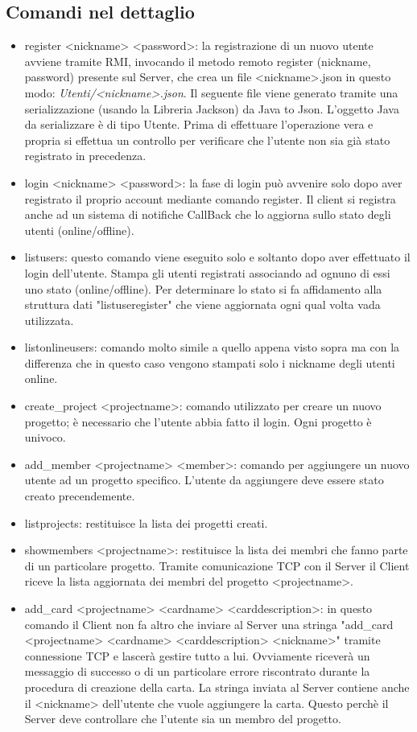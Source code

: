 \documentclass{article} %
\begin{document}
\subsection{Comandi nel dettaglio}
\begin{itemize}
    \item register <nickname> <password>: la registrazione di un nuovo utente avviene tramite RMI, invocando il metodo remoto register (nickname, password) presente sul Server, che crea un file <nickname>.json in questo modo: {\itshape Utenti/<nickname>.json}. Il seguente file viene generato tramite una serializzazione (usando la Libreria Jackson) da Java to Json. L'oggetto Java da serializzare è di tipo Utente. Prima di effettuare l'operazione vera e propria si effettua un controllo per verificare che l'utente non sia già stato registrato in precedenza.
    \item login <nickname> <password>: la fase di login può avvenire solo dopo aver registrato il proprio account mediante comando register. Il client si registra anche ad un sistema di notifiche CallBack che lo aggiorna sullo stato degli utenti (online/offline).
    \item listusers: questo comando viene eseguito solo e soltanto dopo aver effettuato il login dell'utente. Stampa gli utenti registrati associando ad ognuno di essi uno stato (online/offline). Per determinare lo stato si fa affidamento alla struttura dati "listuseregister" che viene aggiornata ogni qual volta vada utilizzata.
    \item listonlineusers: comando molto simile a quello appena visto sopra ma con la differenza che in questo caso vengono stampati solo i nickname degli utenti online.
    \item create\_project <projectname>: comando utilizzato per creare un nuovo progetto; è necessario che l'utente abbia fatto il login. Ogni progetto è univoco.
    \item add\_member <projectname> <member>:  comando per aggiungere un nuovo utente ad un progetto specifico. L'utente da aggiungere deve essere stato creato precendemente. 
    \item listprojects: restituisce la lista dei progetti creati.
    \item showmembers <projectname>: restituisce la lista dei membri che fanno parte di un particolare progetto. Tramite comunicazione TCP con il Server il Client riceve la lista aggiornata dei membri del progetto <projectname>. 
    \item add\_card <projectname> <cardname> <carddescription>:  in questo comando il Client non fa altro che inviare al Server una stringa "add\_card <projectname> <cardname> <carddescription> <nickname>" tramite connessione TCP e lascerà gestire tutto a lui. Ovviamente riceverà un messaggio di successo o di un particolare errore riscontrato durante la procedura di creazione della carta. La stringa inviata al Server contiene anche il <nickname> dell'utente che vuole aggiungere la carta. Questo perchè il Server deve controllare che l'utente sia un membro del progetto.

\end{itemize}
\end{document}
